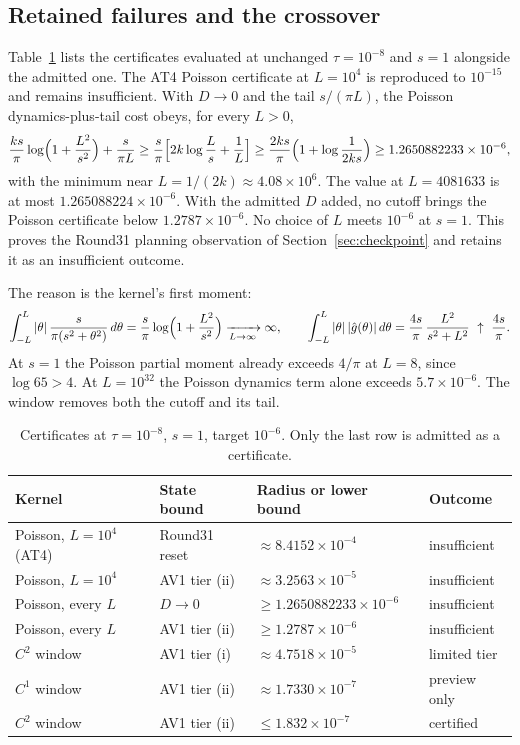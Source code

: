 \subsection{Retained failures and the crossover}
\label{sec:av2-failures}
Table~\ref{tab:av2-failures} lists the certificates evaluated at unchanged
$\tau=10^{-8}$ and $s=1$ alongside the admitted one. The AT4 Poisson
certificate at $L=10^4$ is reproduced to $10^{-15}$ and remains insufficient.
With $D\to0$ and the tail $s/(\pi L)$, the Poisson dynamics-plus-tail cost
obeys, for every $L>0$,
\begin{equation}
 \frac{ks}{\pi}\log\Bigl(1+\frac{L^2}{s^2}\Bigr)+\frac{s}{\pi L}
 \ge\frac s\pi\Bigl[2k\log\frac Ls+\frac1L\Bigr]
 \ge\frac{2ks}{\pi}\Bigl(1+\log\frac1{2ks}\Bigr)
 \ge1.2650882233\times10^{-6},
 \label{eq:av2-floor}
\end{equation}
with the minimum near $L=1/(2k)\approx4.08\times10^6$. The value at
$L=4081633$ is at most $1.265088224\times10^{-6}$. With the admitted $D$
added, no cutoff brings the Poisson certificate below $1.2787\times10^{-6}$.
No choice of $L$ meets $10^{-6}$ at $s=1$. This proves the Round31 planning
observation of Section~\ref{sec:checkpoint} and retains it as an insufficient
outcome.

The reason is the kernel's first moment:
\begin{equation}
 \int_{-L}^{L}|\theta|\,\frac{s}{\pi(s^2+\theta^2)}\,d\theta
 =\frac s\pi\log\Bigl(1+\frac{L^2}{s^2}\Bigr)\xrightarrow[L\to\infty]{}\infty,
 \qquad
 \int_{-L}^{L}|\theta|\,|\hat g(\theta)|\,d\theta
 =\frac{4s}{\pi}\,\frac{L^2}{s^2+L^2}\ \uparrow\ \frac{4s}{\pi}.
 \label{eq:av2-moments}
\end{equation}
At $s=1$ the Poisson partial moment already exceeds $4/\pi$ at $L=8$, since
$\log65>4$. At $L=10^{32}$ the Poisson dynamics term alone exceeds
$5.7\times10^{-6}$. The window removes both the cutoff and its tail.

\begin{table}[htbp]
\centering\small
\caption{Certificates at $\tau=10^{-8}$, $s=1$, target $10^{-6}$. Only the last
row is admitted as a certificate.}
\label{tab:av2-failures}
\begin{tabular}{llll}
\toprule
Kernel & State bound & Radius or lower bound & Outcome\\
\midrule
Poisson, $L=10^4$ (AT4) & Round31 reset & $\approx8.4152\times10^{-4}$ & insufficient\\
Poisson, $L=10^4$ & AV1 tier (ii) & $\approx3.2563\times10^{-5}$ & insufficient\\
Poisson, every $L$ & $D\to0$ & $\ge1.2650882233\times10^{-6}$ & insufficient\\
Poisson, every $L$ & AV1 tier (ii) & $\ge1.2787\times10^{-6}$ & insufficient\\
$C^2$ window & AV1 tier (i) & $\approx4.7518\times10^{-5}$ & limited tier\\
$C^1$ window & AV1 tier (ii) & $\approx1.7330\times10^{-7}$ & preview only\\
$C^2$ window & AV1 tier (ii) & $\le1.832\times10^{-7}$ & certified\\
\bottomrule
\end{tabular}
\end{table}

